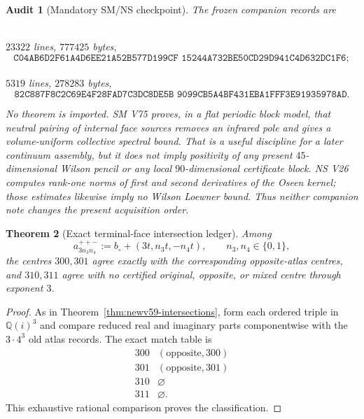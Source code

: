 \documentclass[11pt,oneside]{article}
\newtheorem{theorem}{Theorem}[section]
\newtheorem{audit}[theorem]{Audit}
\theoremstyle{definition}
\theoremstyle{remark}
\begin{document}
\begin{audit}[Mandatory SM/NS checkpoint]
\label{audit:newv60-companions}
The frozen companion records are
\begin{center}
\small
{}\\
\(23322\) lines, \(777425\) bytes,
\[
\texttt{C04AB6D2F61A4D6EE21A52B577D199CF
15244A732BE50CD29D941C4D632DC1F6};
\]
\\
\(5319\) lines, \(278283\) bytes,
\[
\texttt{82C887F8C2C69E4F28FAD7C3DC8DE5B
9099CB5A4BF431EBA1FFF3E91935978AD}.                  \tag{60.1}
\]
\end{center}
No theorem is imported.  SM V75 proves, in a flat periodic block
model, that neutral pairing of internal face sources removes an
infrared pole and gives a volume-uniform collective spectral bound.
That is a useful discipline for a later continuum assembly, but it
does not imply positivity of any present \(45\)-dimensional Wilson
pencil or any local \(90\)-dimensional certificate block.  NS V26
computes rank-one norms of first and second derivatives of the Oseen
kernel; those estimates likewise imply no Wilson Loewner bound.
Thus neither companion note changes the present acquisition order.
\end{audit}

\begin{theorem}[Exact terminal-face intersection ledger]
\label{thm:newv60-intersections}
Among
\[
 a_{3n_3n_4}^{++-}
 :=b_\circ+(3t,n_3t,-n_4t),
 \qquad n_3,n_4\in\{0,1\},                            \tag{60.2}
\]
the centres \(300,301\) agree exactly with the corresponding
opposite-atlas centres, and \(310,311\) agree with no certified
original, opposite, or mixed centre through exponent \(3\).
\end{theorem}

\begin{proof}
As in Theorem~\ref{thm:newv59-intersections}, form each ordered
triple in \(\mathbb Q(i)^3\) and compare reduced real and imaginary
parts componentwise with the \(3\cdot4^3\) old atlas records.  The
exact match table is
\[
\begin{array}{c|c}
300&(\text{opposite},300)\\
301&(\text{opposite},301)\\
310&\varnothing\\
311&\varnothing .
\end{array}
\]
This exhaustive rational comparison proves the classification.
\end{proof}
\end{document}
